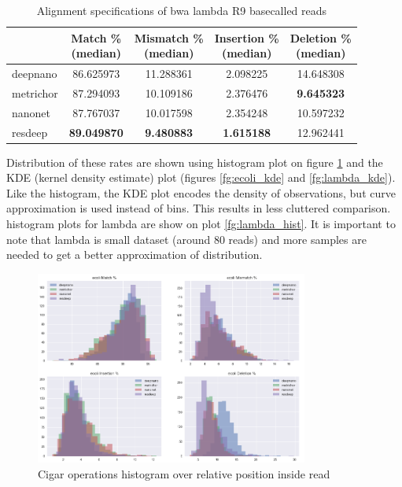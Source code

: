 \documentclass[times, utf8, diplomski, numeric, english]{fer}
\begin{document}
\begin{table}[H]
	\caption{Alignment specifications of bwa lambda R9 basecalled reads}
	\label{tbl:lambda_rates}
	\centering
	\begin{tabular}{lcccc}
		\toprule
		{} &  \thead{Match \% \\(median)} &  \thead{Mismatch \% \\(median)} &  \thead{Insertion \% \\(median)} &  \thead{Deletion \% \\(median)} \\
		\midrule
		
		deepnano   &                  86.625973 &                     11.288361 &                       2.098225 &                     14.648308 \\
		metrichor  &                  87.294093 &                     10.109186 &                       2.376476 &                      \textbf{9.645323 }\\
		nanonet    &                  87.767037 &                     10.017598 &                       2.354248 &                     10.597232 \\
		resdeep    &                 \textbf{ 89.049870} &                     \textbf{ 9.480883} &                       \textbf{1.615188 }&                     12.962441 \\
		\bottomrule
	\end{tabular}
	
\end{table}


Distribution of these rates are shown using  histogram plot on figure \ref{fg:hist} and the KDE (kernel density estimate) plot (figures \ref{fg:ecoli_kde} and \ref{fg:lambda_kde}). Like the histogram, the KDE plot encodes the density of observations, but curve approximation is used instead of bins. This results in less cluttered comparison. 
histogram plots for lambda are show on plot \ref{fg:lambda_hist}. It is important to note that lambda is small dataset (around 80 reads) and more samples are needed to get a better approximation of distribution.

\begin{figure}[!htb]
	\begin{center}
		\includegraphics[width=0.8\textwidth]{./imgs/results/ecoli/hist_20.png}
		\caption{Cigar operations histogram over relative position inside read}
		\label{fg:hist}
	\end{center}
\end{figure}
\end{document}
